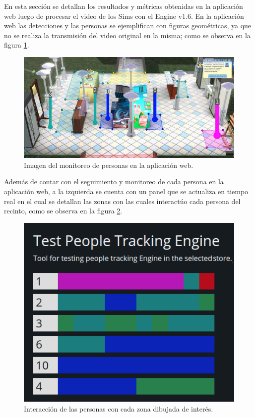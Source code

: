 En esta sección se detallan los resultados y métricas obtenidas en la aplicación web luego de procesar el video de los Sims con el Engine v1.6. En la aplicación web las detecciones y las personas se ejemplifican con figuras geométricas, ya que no se realiza la transmisión del video original en la misma; como se observa en la figura \ref{fig:simsWebApp}.

\begin{figure}[ht]
	\centering
	\includegraphics[scale=.60]{./Figures/simsWebApp.jpg}
	\caption{Imagen del monitoreo de personas en la aplicación web.}
	\label{fig:simsWebApp}
\end{figure}

Además de contar con el seguimiento y monitoreo de cada persona en la aplicación web, a la izquierda se cuenta con un panel que se actualiza en tiempo real en el cual se detallan las zonas con las cuales interactúo cada persona del recinto, como se observa en la figura \ref{fig:simsWebApp2}.

\begin{figure}[ht]
	\centering
	\includegraphics[scale=.80]{./Figures/simsWebApp2.png}
	\caption{Interacción de las personas con cada zona dibujada de interés.}
	\label{fig:simsWebApp2}
\end{figure}

